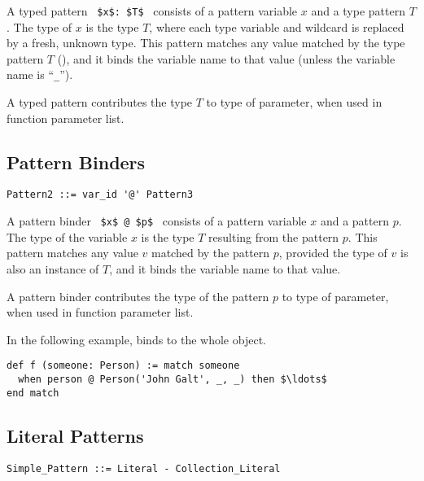 A typed pattern ~\lstinline!$x$: $T$!~ consists of a pattern variable $x$ and a type pattern $T$. The type of $x$ is the type $T$, where each type variable and wildcard is replaced by a fresh, unknown type. This pattern matches any value matched by the type pattern $T$ (), and it binds the variable name to that value (unless the variable name is ``\lstinline!_!''). 

A typed pattern contributes the type $T$ to type of parameter, when used in function parameter list. 






\subsection{Pattern Binders}
\label{sec:pattern-binders}

\syntax\begin{lstlisting}
Pattern2 ::= var_id '@' Pattern3
\end{lstlisting}

A pattern binder ~\lstinline!$x$ @ $p$!~ consists of a pattern variable $x$ and a pattern $p$. The type of the variable $x$ is the type $T$ resulting from the pattern $p$. This pattern matches any value $v$ matched by the pattern $p$, provided the type of $v$ is also an instance of $T$, and it binds the variable name to that value. 

A pattern binder contributes the type of the pattern $p$ to type of parameter, when used in function parameter list. 

\example In the following example,  binds to the whole  object. 
\begin{lstlisting}
def f (someone: Person) := match someone
  when person @ Person('John Galt', _, _) then $\ldots$
end match
\end{lstlisting}







\subsection{Literal Patterns}
\label{sec:literal-patterns}

\syntax\begin{lstlisting}
Simple_Pattern ::= Literal - Collection_Literal
\end{lstlisting}

